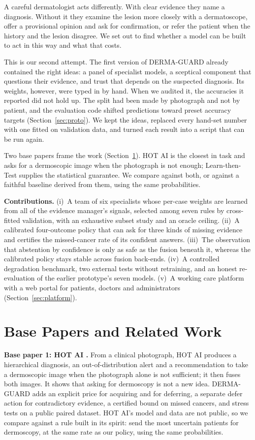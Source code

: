 \documentclass[conference]{IEEEtran}
\begin{document}
A careful dermatologist acts differently. With clear evidence they name a diagnosis. Without it they examine the lesion more closely with a dermatoscope, offer a provisional opinion and ask for confirmation, or refer the patient when the history and the lesion disagree. We set out to find whether a model can be built to act in this way and what that costs.

This is our second attempt. The first version of DERMA-GUARD already contained the right ideas: a panel of specialist models, a sceptical component that questions their evidence, and trust that depends on the suspected diagnosis. Its weights, however, were typed in by hand. When we audited it, the accuracies it reported did not hold up. The split had been made by photograph and not by patient, and the evaluation code shifted predictions toward preset accuracy targets (Section~\ref{sec:proto}). We kept the ideas, replaced every hand-set number with one fitted on validation data, and turned each result into a script that can be run again.

Two base papers frame the work (Section~\ref{sec:related}). HOT AI \cite{r2} is the closest in task and asks for a dermoscopic image when the photograph is not enough; Learn-then-Test \cite{r3} supplies the statistical guarantee. We compare against both, or against a faithful baseline derived from them, using the same probabilities.

\textbf{Contributions.}
(i)~A team of six specialists whose per-case weights are learned from all of the evidence manager's signals, selected among seven rules by cross-fitted validation, with an exhaustive subset study and an oracle ceiling.
(ii)~A calibrated four-outcome policy that can ask for three kinds of missing evidence and certifies the missed-cancer rate of its confident answers.
(iii)~The observation that abstention by confidence is only as safe as the fusion beneath it, whereas the calibrated policy stays stable across fusion back-ends.
(iv)~A controlled degradation benchmark, two external tests without retraining, and an honest re-evaluation of the earlier prototype's seven models.
(v)~A working care platform with a web portal for patients, doctors and administrators (Section~\ref{sec:platform}).

\section{Base Papers and Related Work}
\label{sec:related}
\textbf{Base paper 1: HOT AI \cite{r2}.} From a clinical photograph, HOT AI produces a hierarchical diagnosis, an out-of-distribution alert and a recommendation to take a dermoscopic image when the photograph alone is not sufficient; it then fuses both images. It shows that asking for dermoscopy is not a new idea. DERMA-GUARD adds an explicit price for acquiring and for deferring, a separate defer action for contradictory evidence, a certified bound on missed cancers, and stress tests on a public paired dataset. HOT AI's model and data are not public, so we compare against a rule built in its spirit: send the most uncertain patients for dermoscopy, at the same rate as our policy, using the same probabilities.
\end{document}

